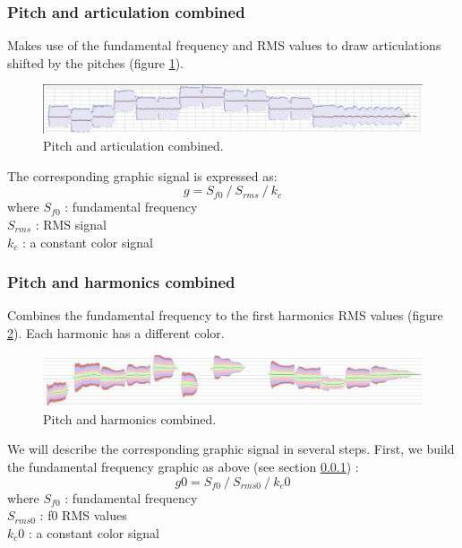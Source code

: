 \documentclass{article}
\newcommand{\rshift}			{\hspace*{9mm}}
\begin{document}
\subsubsection{Pitch and articulation combined}
\label{pitchart}
Makes use of the fundamental frequency and RMS values to draw articulations shifted by the pitches
(figure \ref{fig:pitchedarticulation}).
\begin{figure}[htbp]
\centerline{
	\includegraphics[width=0.99\columnwidth]{imgs/curves/pitchedarticulation}}
\caption{Pitch and articulation combined.}
\label{fig:pitchedarticulation}
\end{figure}

The corresponding graphic signal is expressed as:
\[ g = S_{f0}\ /\ S_{rms}\ /\ k_c \]
where $S_{f0}$ : fundamental frequency \\
\rshift	 $S_{rms}$ : RMS signal \\
\rshift	 $k_c$ : a constant color signal 
 
\subsubsection{Pitch and harmonics combined}
Combines the fundamental frequency to the first harmonics RMS values
(figure \ref{fig:pitchedstackedharm}). Each harmonic has a different color.
\begin{figure}[htbp]
\centerline{
	\includegraphics[width=0.99\columnwidth]{imgs/curves/pitchedstackedharm}}
\caption{Pitch and harmonics combined.}
\label{fig:pitchedstackedharm}
\end{figure}

We will describe the corresponding graphic signal in several steps. First, we build the fundamental frequency graphic as above (see section \ref{pitchart}) :
\[ g0 = S_{f0}\ /\ S_{rms0}\ /\ k_c0 \]
where $S_{f0}$ : fundamental frequency \\
\rshift	 $S_{rms0}$ : f0 RMS values \\
\rshift $k_c0$ : a constant color signal 
\end{document}
